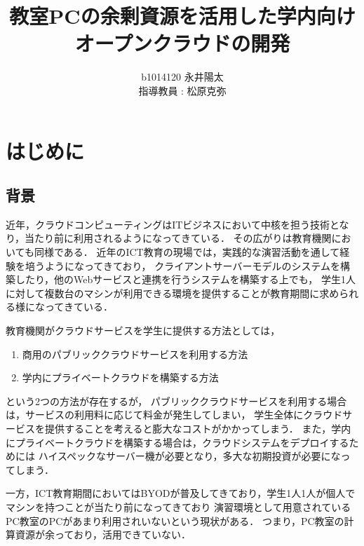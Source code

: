 ﻿%
%
%
\author{%
b1014120 永井陽太\\指導教員 : 松原克弥
}

\title{教室PCの余剰資源を活用した学内向けオープンクラウドの開発}

\maketitle

\section{はじめに}
\subsection{背景}
近年，クラウドコンピューティングはITビジネスにおいて中核を担う技術となり，当たり前に利用されるようになってきている．
その広がりは教育機関においても同様である．
近年のICT教育の現場では，実践的な演習活動を通して経験を培うようになってきており，
クライアントサーバーモデルのシステムを構築したり，他のWebサービスと連携を行うシステムを構築する上でも，
学生1人に対して複数台のマシンが利用できる環境を提供することが教育期間に求められる様になってきている．
\par 教育機関がクラウドサービスを学生に提供する方法としては，
\begin{enumerate}
	\item 商用のパブリッククラウドサービスを利用する方法
	\item 学内にプライベートクラウドを構築する方法
\end{enumerate}
という2つの方法が存在するが，
パブリッククラウドサービスを利用する場合は，サービスの利用料に応じて料金が発生してしまい，
学生全体にクラウドサービスを提供することを考えると膨大なコストがかかってしまう．
また，学内にプライベートクラウドを構築する場合は，クラウドシステムをデプロイするためには
ハイスペックなサーバー機が必要となり，多大な初期投資が必要になってしまう．
\par 一方，ICT教育期間においてはBYODが普及してきており，学生1人1人が個人でマシンを持つことが当たり前になってきており
演習環境として用意されているPC教室のPCがあまり利用されいないという現状がある．
つまり，PC教室の計算資源が余っており，活用できていない．
